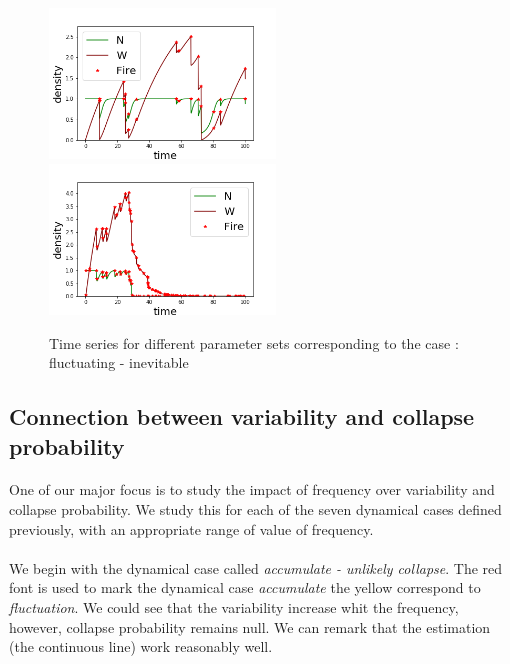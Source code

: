 \documentclass{article}
\begin{document}

\begin{figure}[h!]
\centering
\includegraphics[width=6cm]{equivalent_low_between_1.png}
\includegraphics[width=6cm]{equivalent_low_between_2.png}
\caption{Time series for different parameter sets corresponding to the case : fluctuating - inevitable}
\end{figure}




\newpage
\subsection{Connection between variability and collapse probability}

\label{impact_freq}

\paragraph{}
One of our major focus is to study the impact of frequency over variability and collapse probability. We study this for each of the seven dynamical cases defined previously, with an appropriate range of value of frequency.

\paragraph{}
We begin with the dynamical case called \textit{accumulate - unlikely collapse}. The red font is used to mark the dynamical case \textit{accumulate} the yellow correspond to \textit{fluctuation}. We could see that the variability increase whit the frequency, however, collapse probability remains null. We can remark that the estimation (the continuous line) work reasonably well. 
\end{document}
